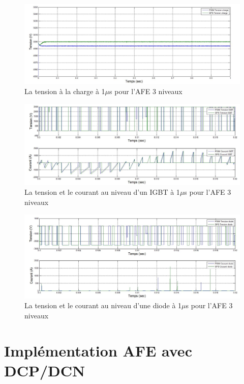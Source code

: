 \documentclass[11pt,letterpaper,final]{report}
\begin{document}
\begin{figure}[htb]
\centering
\includegraphics[scale=0.5]{Fig/AFE3LEVEL/1u/vch.jpg}
\caption{La tension à la charge à 1$\mu$s pour l'AFE 3 niveaux}
\label{AF_3_vch}
\end{figure}


\begin{figure}[htb]
\centering
\includegraphics[scale=0.5]{Fig/AFE3LEVEL/1u/IGBT.jpg}
\caption{La tension et le courant au niveau d'un IGBT à 1$\mu$s pour l'AFE 3 niveaux}
\label{AF_3_IGBT}
\end{figure}

\begin{figure}[htb]
\centering
\includegraphics[scale=0.5]{Fig/AFE3LEVEL/1u/DIODE.jpg}
\caption{La tension et le courant au niveau d'une diode à 1$\mu$s pour l'AFE 3 niveaux}
\label{AF_3_DIODE}
\end{figure}


\clearpage
\section{Implémentation AFE avec DCP/DCN}
\end{document}
